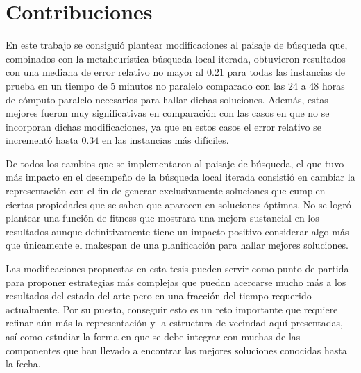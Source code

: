 \section{Contribuciones}
En este trabajo se consiguió plantear modificaciones al paisaje de búsqueda que, combinados con la metaheurística búsqueda local iterada, obtuvieron resultados 
con una mediana de error relativo no mayor al $0.21$ para todas las instancias de prueba en un tiempo de 5 minutos no paralelo comparado con las 24 a 48 horas 
de cómputo paralelo necesarios para hallar dichas soluciones.
%
Además, estas mejores fueron muy significativas en comparación con las casos en que no se incorporan dichas modificaciones, ya que en estos casos el error
relativo se incrementó hasta $0.34$ en las instancias más difíciles.

De todos los cambios que se implementaron al paisaje de búsqueda, el que tuvo más impacto en el desempeño de la búsqueda local iterada consistió en cambiar 
la representación con el fin de generar exclusivamente soluciones que cumplen ciertas propiedades que se saben que aparecen en soluciones óptimas.
%
No se logró plantear una función de fitness que mostrara una mejora sustancial en los resultados aunque definitivamente tiene un impacto positivo considerar 
algo más que únicamente el makespan de una planificación para hallar mejores soluciones.

Las modificaciones propuestas en esta tesis pueden servir como punto de partida para proponer estrategias más complejas que puedan acercarse mucho más a los 
resultados del estado del arte pero en una fracción del tiempo requerido actualmente. 
%
Por su puesto, conseguir esto es un reto importante que requiere refinar aún más la representación y la estructura de vecindad aquí presentadas, así como
estudiar la forma en que se debe integrar con muchas de las componentes que han llevado a encontrar las mejores soluciones conocidas hasta la fecha.


